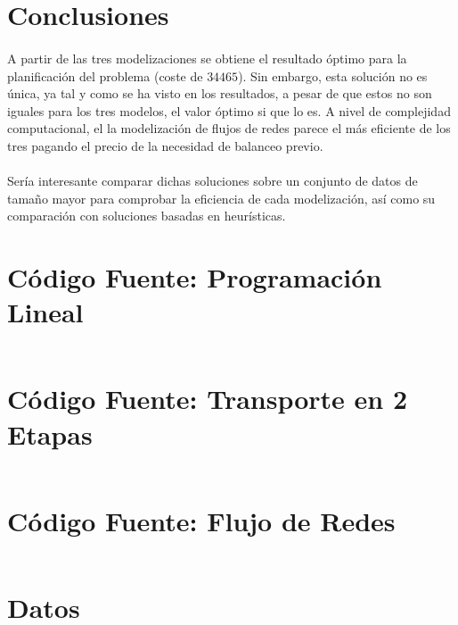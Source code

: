 \documentclass{article}
\begin{document}
  \section{Conclusiones}
  \label{section:conclusions}

    \paragraph{}
    A partir de las tres modelizaciones se obtiene el resultado óptimo para la planificación del problema (coste de \textbf{$34465$}). Sin embargo, esta solución no es única, ya tal y como se ha visto en los resultados, a pesar de que estos no son iguales para los tres modelos, el valor óptimo si que lo es. A nivel de complejidad computacional, el la modelización de flujos de redes parece el más eficiente de los tres pagando el precio de la necesidad de balanceo previo.

    \paragraph{}
    Sería interesante comparar dichas soluciones sobre un conjunto de datos de tamaño mayor para comprobar la eficiencia de cada modelización, así como su comparación con soluciones basadas en heurísticas.

  \begin{appendices}

    \section{Código Fuente: Programación Lineal}
    \label{appendix:source-code-linear-programmming}

      \inputminted{text}{./../mosel/linear-programming-model.mos}

    \section{Código Fuente: Transporte en 2 Etapas}
    \label{appendix:source-code-transportation}

      \inputminted{text}{./../mosel/two-steps-transportation-model.mos}

    \section{Código Fuente: Flujo de Redes}
    \label{appendix:source-code-network-flow}

      \inputminted{text}{./../mosel/network-flow-model.mos}

    \section{Datos}
    \label{appendix:data}

      \inputminted{text}{./../mosel/data.dat}

  \end{appendices}






  \nocite{subject:pent2017}
  \nocite{tool:xpress-mosel}
  \nocite{repository:network-flow-transeuro}

  
  
\end{document}
